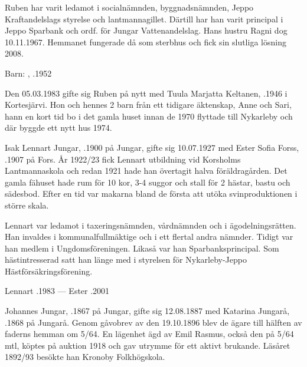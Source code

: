 Ruben har varit ledamot i socialnämnden, byggnadsnämnden, Jeppo Kraftandelslags styrelse och lantmannagillet. Därtill har han varit principal i Jeppo Sparbank och ordf. för Jungar Vattenandelslag. Hans hustru Ragni dog 10.11.1967. Hemmanet fungerade då som sterbhus och fick sin slutliga lösning 2008.

Barn: , .1952

Den 05.03.1983 gifte sig Ruben på nytt med Tuula Marjatta Keltanen, .1946 i Kortesjärvi. Hon och hennes 2 barn från ett tidigare äktenskap, Anne och Sari, hann en kort tid bo i det gamla huset innan de 1970 flyttade till Nykarleby och där byggde ett nytt hus 1974.


Isak Lennart Jungar, .1900 på Jungar, gifte sig 10.07.1927 med Ester Sofia Forss, .1907 på Fors. År 1922/23 fick Lennart utbildning vid Korsholms Lantmannaskola och redan 1921 hade han övertagit halva föräldragården. Det gamla fähuset hade rum för 10 kor, 3-4 suggor och stall för 2 hästar, bastu och sädesbod. Efter en tid var makarna bland de första att utöka svinproduktionen i större  skala.

Lennart var ledamot i taxeringsnämnden, vårdnämnden och i ägodelningsrätten. Han invaldes i kommunalfullmäktige och i ett
flertal andra nämnder. Tidigt var han medlem i Ungdomsföreningen. Likaså var han Sparbanksprincipal. Som hästintresserad satt han länge med i styrelsen för Nykarleby-Jeppo Hästförsäkringsförening.
\begin{jhchildren}
  \item {}
  \item {}
  \item {}
  \item {}
\end{jhchildren}

Lennart .1983  ---  Ester .2001


Johannes Jungar, .1867 på Jungar, gifte sig 12.08.1887 med Katarina Jungarå, .1868 på Jungarå. Genom gåvobrev av den 19.10.1896 blev de ägare till hälften av faderns hemman om 5/64. En lägenhet ägd av Emil Rasmus, också den på 5/64 mtl, köptes på auktion 1918 och gav utrymme för ett aktivt brukande. Läsåret 1892/93 besökte han Kronoby Folkhögskola.

